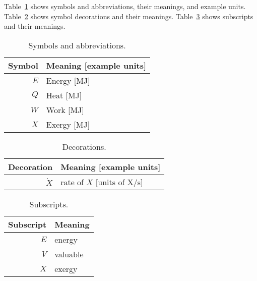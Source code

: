 
Table~\ref{tab:symbols} shows symbols and abbreviations, their meanings, and example units.
Table~\ref{tab:decorations} shows symbol decorations and their meanings.
Table~\ref{tab:subscripts} shows subscripts and their meanings.


  
\begin{table}
\centering %
\caption{Symbols and abbreviations.}
\begin{tabular}{r l}
\toprule
Symbol & Meaning [example units] \\
\midrule
$E$ & Energy [MJ] \\
$Q$ & Heat [MJ] \\
$W$ & Work [MJ] \\
$X$ & Exergy [MJ] \\
\bottomrule
\end{tabular}
\label{tab:symbols}
\end{table}


  
\begin{table}
\centering %
\caption{Decorations.}
\begin{tabular}{r l}
\toprule
Decoration & Meaning [example units] \\
\midrule
$\dot{X}$ & rate of $X$ [units of X/s] \\
\bottomrule
\end{tabular}
\label{tab:decorations}
\end{table}


  
\begin{table}
\centering
\caption{Subscripts.}
\begin{tabular}{r l}
\toprule
Subscript & Meaning \\
\midrule
$E$ & energy \\
$V$ & valuable \\
$X$ & exergy \\
\bottomrule
\end{tabular}
\label{tab:subscripts}
\end{table}


